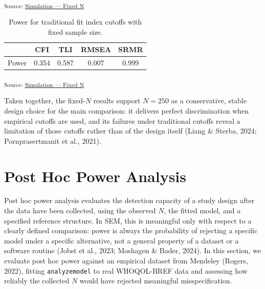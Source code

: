 \documentclass[
  letterpaper,
  DIV=11,
  numbers=noendperiod]{scrartcl}
\begin{document}
\textsubscript{Source:
\href{https://phdpablo.github.io/cfa-power/Scripts/AnalysisScripts/05_model_comparison-preview.html\#cell-fig-curve-fixed-traditional}{Simulation
--- Fixed N}}

{

\begin{longtable}[]{@{}lcccc@{}}

\caption{\label{tbl-power-cutoff-traditional-fixed}Power for traditional
fit index cutoffs with fixed sample size.}

\tabularnewline

\toprule\noalign{}
& CFI & TLI & RMSEA & SRMR \\
\midrule\noalign{}
\endhead
\bottomrule\noalign{}
\endlastfoot
Power & 0.354 & 0.587 & 0.007 & 0.999 \\

\end{longtable}

}

\textsubscript{Source:
\href{https://phdpablo.github.io/cfa-power/Scripts/AnalysisScripts/05_model_comparison-preview.html\#cell-tbl-power-cutoff-traditional-fixed}{Simulation
--- Fixed N}}

Taken together, the fixed-\(N\) results support \(N = 250\) as a
conservative, stable design choice for the main comparison: it delivers
perfect discrimination when empirical cutoffs are used, and its failures
under traditional cutoffs reveal a limitation of those cutoffs rather
than of the design itself (Liang \& Sterba, 2024; Pornprasertmanit et
al., 2021).

\section{Post Hoc Power Analysis}\label{sec-post-hoc}

Post hoc power analysis evaluates the detection capacity of a study
design after the data have been collected, using the observed \(N\), the
fitted model, and a specified reference structure. In SEM, this is
meaningful only with respect to a clearly defined comparison: power is
always the probability of rejecting a specific model under a specific
alternative, not a general property of a dataset or a software routine
(Jobst et al., 2023; Moshagen \& Bader, 2024). In this section, we
evaluate post hoc power against an empirical dataset from Mendeley
(Rogers, 2022), fitting \texttt{analyzemodel} to real WHOQOL-BREF data
and assessing how reliably the collected \(N\) would have rejected
meaningful misspecification.
\end{document}
